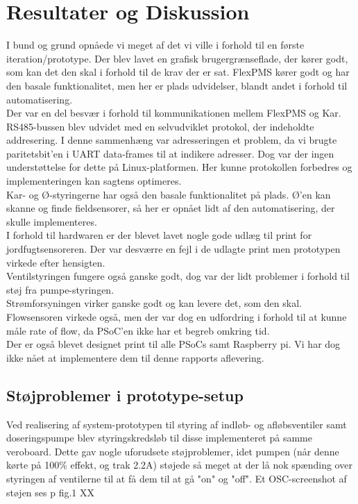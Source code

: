 \section{Resultater og Diskussion}
I bund og grund opnåede vi meget af det vi ville i forhold til en første iteration/prototype. Der blev lavet en grafisk brugergrænseflade, der kører godt, som kan det den skal i forhold til de krav der er sat. FlexPMS kører godt og har den basale funktionalitet, men her er plads udvidelser, blandt andet i forhold til automatisering.\\
Der var en del besvær i forhold til kommunikationen mellem FlexPMS og Kar. RS485-bussen blev udvidet med en selvudviklet protokol, der indeholdte addresering. I denne sammenhæng var adresseringen et problem, da vi brugte paritetsbit'en i UART data-frames til at indikere adresser. Dog var der ingen understøttelse for dette på Linux-platformen. Her kunne protokollen forbedres og implementeringen kan sagtens optimeres.\\
Kar- og Ø-styringerne har også den basale funktionalitet på plads. Ø'en kan skanne og finde fieldsensorer, så her er opnået lidt af den automatisering, der skulle implementeres.\\
I forhold til hardwaren er der blevet lavet nogle gode udlæg til print for jordfugtsensoreren. Der var desværre en fejl i de udlagte print men prototypen virkede efter hensigten. \\
Ventilstyringen fungere også ganske godt, dog var der lidt problemer i forhold til støj fra pumpe-styringen.\\
Strømforsyningen virker ganske godt og kan levere det, som den skal. \\
Flowsensoren virkede også, men der var dog en udfordring i forhold til at kunne måle rate of flow, da PSoC'en ikke har et begreb omkring tid.\\
Der er også blevet designet print til alle PSoCs samt Raspberry pi. Vi har dog ikke nået at implementere dem til denne rapports aflevering.
   

\subsection{Støjproblemer i prototype-setup}

Ved realisering af system-prototypen til styring af indløb- og afløbsventiler samt doseringspumpe blev styringskredsløb til disse implementeret på samme veroboard. 
Dette gav nogle uforudsete støjproblemer, idet pumpen (når denne kørte på 100\% effekt, og trak 2.2A) støjede så meget at der lå nok spænding over styringen af ventilerne til at få dem til at gå "on" og "off".
Et OSC-screenshot af støjen ses p fig.1 XX\\

